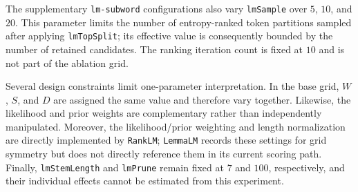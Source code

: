 The supplementary \texttt{lm-subword} configurations also vary
\texttt{lmSample} over $5$, $10$, and $20$. This parameter limits the number
of entropy-ranked token partitions sampled after applying
\texttt{lmTopSplit}; its effective value is consequently bounded by the
number of retained candidates. The ranking iteration count is fixed at $10$
and is not part of the ablation grid.

Several design constraints limit one-parameter interpretation. In the base
grid, $W$, $S$, and $D$ are assigned the same value and therefore vary
together. Likewise, the likelihood and prior weights are complementary rather
than independently manipulated. Moreover, the likelihood/prior weighting and
length normalization are directly implemented by \texttt{RankLM};
\texttt{LemmaLM} records these settings for grid symmetry but does not
directly reference them in its current scoring path. Finally,
\texttt{lmStemLength} and \texttt{lmPrune} remain fixed at $7$ and $100$,
respectively, and their individual effects cannot be estimated from this
experiment.
